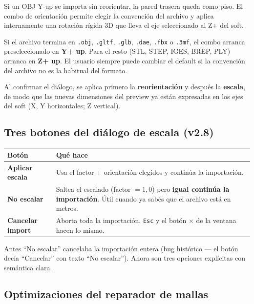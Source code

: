 \documentclass[11pt, a4paper]{article}
\newenvironment{nota}[1][Nota]{%
  \begin{tcolorbox}[mybox=cBlue, title={#1}]%
}{\end{tcolorbox}}
\newcommand{\menu}[1]{\textbf{\guillemotleft #1\guillemotright}}
\begin{document}
\vspace{0.4em}
Si un OBJ Y-up se importa sin reorientar, la pared trasera queda como
piso. El combo de orientación permite elegir la convención del archivo y
aplica internamente una rotación rígida 3D que lleva el eje seleccionado
al Z$+$ del soft.

\begin{nota}[Sugerencia automática por extensión]
Si el archivo termina en \texttt{.obj}, \texttt{.gltf}, \texttt{.glb},
\texttt{.dae}, \texttt{.fbx} o \texttt{.3mf}, el combo arranca
preseleccionado en \textbf{Y+ up}. Para el resto (STL, STEP, IGES, BREP,
PLY) arranca en \textbf{Z+ up}. El usuario siempre puede cambiar el
default si la convención del archivo no es la habitual del formato.
\end{nota}

Al confirmar el diálogo, se aplica primero la \textbf{reorientación} y
después la \textbf{escala}, de modo que las nuevas dimensiones del
preview ya están expresadas en los ejes del soft (X, Y horizontales;
Z vertical).

\subsection{Tres botones del diálogo de escala (v2.8)}

\begin{tabular}{lp{9cm}}
  \toprule
  Botón & Qué hace \\
  \midrule
  \menu{Aplicar escala} & Usa el factor + orientación elegidos y
    continúa la importación. \\
  \menu{No escalar} & Saltea el escalado (factor $=1{,}0$) pero
    \textbf{igual continúa la importación}. Útil cuando ya sabés que el
    archivo está en metros. \\
  \menu{Cancelar import} & Aborta toda la importación. \texttt{Esc} y el
    botón $\times$ de la ventana hacen lo mismo. \\
  \bottomrule
\end{tabular}

\begin{nota}[Cambio en v2.8]
Antes ``No escalar'' cancelaba la importación entera (bug histórico ---
el botón decía ``Cancelar'' con texto ``No escalar''). Ahora son tres
opciones explícitas con semántica clara.
\end{nota}

\subsection{Optimizaciones del reparador de mallas}
\end{document}
